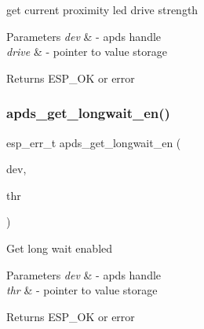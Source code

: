 \begin{DoxyItemize}
\item get current proximity led drive strength 
\end{DoxyItemize}


\begin{DoxyParams}{Parameters}
{\em dev} & -\/ apds handle \\
\hline
{\em drive} & -\/ pointer to value storage \\
\hline
\end{DoxyParams}
\begin{DoxyReturn}{Returns}
E\+S\+P\+\_\+\+OK or error 
\end{DoxyReturn}
\mbox{\label{group__APDS9960__GeneralFunctions_ga98dd5b276349b3c1acd1b8c18eed1c10}} 
\subsubsection{\texorpdfstring{apds\+\_\+get\+\_\+longwait\+\_\+en()}{apds\_get\_longwait\_en()}}
{\footnotesize\ttfamily esp\+\_\+err\+\_\+t apds\+\_\+get\+\_\+longwait\+\_\+en (\begin{DoxyParamCaption}\item[{\hyperlink{structAPDS9960__Driver}{A\+P\+D\+S\+\_\+\+D\+EV}}]{dev,  }\item[{\hyperlink{vl53l0x__types_8h_aba7bc1797add20fe3efdf37ced1182c5}{uint8\+\_\+t} $\ast$}]{thr }\end{DoxyParamCaption})}




\begin{DoxyItemize}
\item Get long wait enabled 
\end{DoxyItemize}


\begin{DoxyParams}{Parameters}
{\em dev} & -\/ apds handle \\
\hline
{\em thr} & -\/ pointer to value storage \\
\hline
\end{DoxyParams}
\begin{DoxyReturn}{Returns}
E\+S\+P\+\_\+\+OK or error 
\end{DoxyReturn}
\mbox{\label{group__APDS9960__GeneralFunctions_ga64832cb79d542441fc1389fa66334f12}} 
